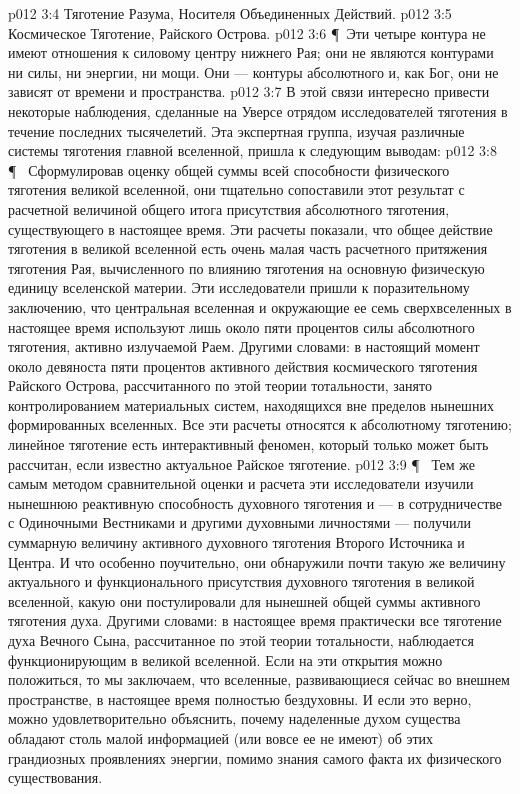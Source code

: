 \vs p012 3:4 \bibnobreakspace Тяготение Разума, Носителя Объединенных Действий.
\vs p012 3:5 \bibnobreakspace Космическое Тяготение, Райского Острова.
\vs p012 3:6 \P\ Эти четыре контура не имеют отношения к силовому центру нижнего Рая; они не являются контурами ни силы, ни энергии, ни мощи. Они --- контуры абсолютного  и, как Бог, они не зависят от времени и пространства.
\vs p012 3:7 В этой связи интересно привести некоторые наблюдения, сделанные на Уверсе отрядом исследователей тяготения в течение последних тысячелетий. Эта экспертная группа, изучая различные системы тяготения главной вселенной, пришла к следующим выводам:
\vs p012 3:8 \P\ \bibnobreakspace {} Сформулировав оценку общей суммы всей способности физического тяготения великой вселенной, они тщательно сопоставили этот результат с расчетной величиной общего итога присутствия абсолютного тяготения, существующего в настоящее время. Эти расчеты показали, что общее действие тяготения в великой вселенной есть очень малая часть расчетного притяжения тяготения Рая, вычисленного по влиянию тяготения на основную физическую единицу вселенской материи. Эти исследователи пришли к поразительному заключению, что центральная вселенная и окружающие ее семь сверхвселенных в настоящее время используют лишь около пяти процентов силы абсолютного тяготения, активно излучаемой Раем. Другими словами: в настоящий момент около девяноста пяти процентов активного действия космического тяготения Райского Острова, рассчитанного по этой теории тотальности, занято контролированием материальных систем, находящихся вне пределов нынешних формированных вселенных. Все эти расчеты относятся к абсолютному тяготению; линейное тяготение есть интерактивный феномен, который только может быть рассчитан, если известно актуальное Райское тяготение.
\vs p012 3:9 \P\ \bibnobreakspace {} Тем же самым методом сравнительной оценки и расчета эти исследователи изучили нынешнюю реактивную способность духовного тяготения и --- в сотрудничестве с Одиночными Вестниками и другими духовными личностями --- получили суммарную величину активного духовного тяготения Второго Источника и Центра. И что особенно поучительно, они обнаружили почти такую же величину актуального и функционального присутствия духовного тяготения в великой вселенной, какую они постулировали для нынешней общей суммы активного тяготения духа. Другими словами: в настоящее время практически все тяготение духа Вечного Сына, рассчитанное по этой теории тотальности, наблюдается функционирующим в великой вселенной. Если на эти открытия можно положиться, то мы заключаем, что вселенные, развивающиеся сейчас во внешнем пространстве, в настоящее время полностью бездуховны. И если это верно, можно удовлетворительно объяснить, почему наделенные духом существа обладают столь малой информацией (или вовсе ее не имеют) об этих грандиозных проявлениях энергии, помимо знания самого факта их физического существования.
